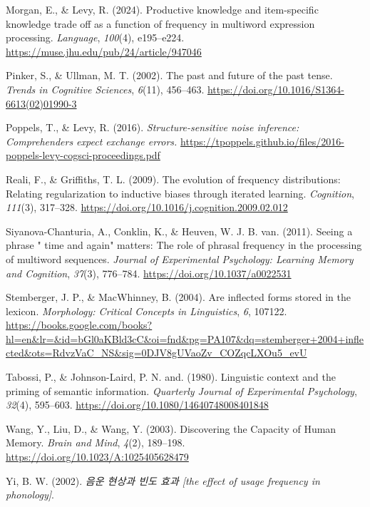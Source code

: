\documentclass[
  12pt,
]{scrartcl}
\newlength{\cslhangindent}
\newenvironment{CSLReferences}[2] %
 {\begin{list}{}{%
  \setlength{\itemindent}{0pt}
  \setlength{\leftmargin}{0pt}
  \setlength{\parsep}{0pt}
  \ifodd #1
   \setlength{\leftmargin}{\cslhangindent}
   \setlength{\itemindent}{-1\cslhangindent}
  \fi
  \setlength{\itemsep}{#2\baselineskip}}}
 {\end{list}}
\begin{document}
\begin{CSLReferences}{1}{0}
Morgan, E., \& Levy, R. (2024). Productive knowledge and item-specific
knowledge trade off as a function of frequency in multiword expression
processing. \emph{Language}, \emph{100}(4), e195--e224.
\url{https://muse.jhu.edu/pub/24/article/947046}

Pinker, S., \& Ullman, M. T. (2002). The past and future of the past
tense. \emph{Trends in Cognitive Sciences}, \emph{6}(11), 456--463.
\url{https://doi.org/10.1016/S1364-6613(02)01990-3}

Poppels, T., \& Levy, R. (2016). \emph{Structure-sensitive noise
inference: Comprehenders expect exchange errors.}
\url{https://tpoppels.github.io/files/2016-poppels-levy-cogsci-proceedings.pdf}

Reali, F., \& Griffiths, T. L. (2009). The evolution of frequency
distributions: Relating regularization to inductive biases through
iterated learning. \emph{Cognition}, \emph{111}(3), 317--328.
\url{https://doi.org/10.1016/j.cognition.2009.02.012}

Siyanova-Chanturia, A., Conklin, K., \& Heuven, W. J. B. van. (2011).
Seeing a phrase {"} time and again{"} matters: The role of phrasal
frequency in the processing of multiword sequences. \emph{Journal of
Experimental Psychology: Learning Memory and Cognition}, \emph{37}(3),
776--784. \url{https://doi.org/10.1037/a0022531}

Stemberger, J. P., \& MacWhinney, B. (2004). Are inflected forms stored
in the lexicon. \emph{Morphology: Critical Concepts in Linguistics},
\emph{6}, 107122.
\url{https://books.google.com/books?hl=en&lr=&id=bGl0aKBld3cC&oi=fnd&pg=PA107&dq=stemberger+2004+inflected&ots=RdvzVaC_NS&sig=0DJV8gUVaoZv_COZqcLXOu5_evU}

Tabossi, P., \& Johnson-Laird, P. N. and. (1980). Linguistic context and
the priming of semantic information. \emph{Quarterly Journal of
Experimental Psychology}, \emph{32}(4), 595--603.
\url{https://doi.org/10.1080/14640748008401848}

Wang, Y., Liu, D., \& Wang, Y. (2003). Discovering the Capacity of Human
Memory. \emph{Brain and Mind}, \emph{4}(2), 189--198.
\url{https://doi.org/10.1023/A:1025405628479}

Yi, B. W. (2002). \emph{음운 현상과 빈도 효과 {[}the effect of usage
frequency in phonology{]}}.

\end{CSLReferences}
\end{document}
